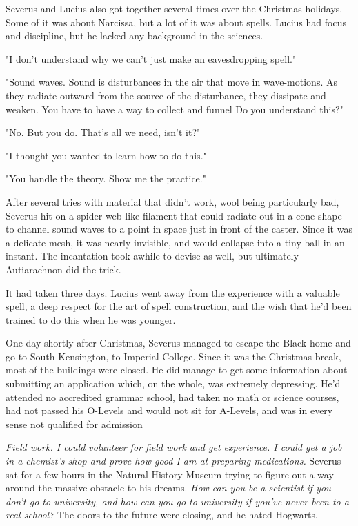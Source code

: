 Severus and Lucius also got together several times over the Christmas holidays. Some of it was about Narcissa, but a lot of it was about spells. Lucius had focus and discipline, but he lacked any background in the sciences.

"I don't understand why we can't just make an eavesdropping spell."

"Sound waves. Sound is disturbances in the air that move in wave-motions. As they radiate outward from the source of the disturbance, they dissipate and weaken. You have to have a way to collect and funnel{\el} Do you understand this?"

"No. But you do. That's all we need, isn't it?"

"I thought you wanted to learn how to do this."

"You handle the theory. Show me the practice."

After several tries with material that didn't work, wool being particularly bad, Severus hit on a spider web-like filament that could radiate out in a cone shape to channel sound waves to a point in space just in front of the caster. Since it was a delicate mesh, it was nearly invisible, and would collapse into a tiny ball in an instant. The incantation took awhile to devise as well, but ultimately Autiarachnon did the trick.

It had taken three days. Lucius went away from the experience with a valuable spell, a deep respect for the art of spell construction, and the wish that he'd been trained to do this when he was younger.

One day shortly after Christmas, Severus managed to escape the Black home and go to South Kensington, to Imperial College. Since it was the Christmas break, most of the buildings were closed. He did manage to get some information about submitting an application which, on the whole, was extremely depressing. He'd attended no accredited grammar school, had taken no math or science courses, had not passed his O-Levels and would not sit for A-Levels, and was in every sense not qualified for admission

\emph{Field work. I could volunteer for field work and get experience. I could get a job in a chemist's shop and prove how good I am at preparing medications.} Severus sat for a few hours in the Natural History Museum trying to figure out a way around the massive obstacle to his dreams. \emph{How can you be a scientist if you don't go to university, and how can you go to university if you've never been to a real school?} The doors to the future were closing, and he hated Hogwarts.

